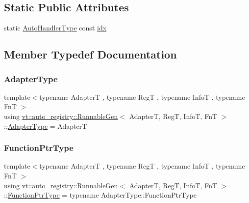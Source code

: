 \subsection*{Static Public Attributes}
\begin{DoxyCompactItemize}
\item 
static \hyperlink{namespacevt_1_1auto__registry_ae295e18699146815bb7d7674594d95d7}{Auto\+Handler\+Type} const \hyperlink{structvt_1_1auto__registry_1_1_runnable_gen_a7feb1522810ba800d935ee58d970720d}{idx}
\end{DoxyCompactItemize}


\subsection{Member Typedef Documentation}
\mbox{\label{structvt_1_1auto__registry_1_1_runnable_gen_a19d340c580c1b042a173e22650f88cd7}} 
\subsubsection{\texorpdfstring{Adapter\+Type}{AdapterType}}
{\footnotesize\ttfamily template$<$typename AdapterT , typename RegT , typename InfoT , typename FnT $>$ \\
using \hyperlink{structvt_1_1auto__registry_1_1_runnable_gen}{vt\+::auto\+\_\+registry\+::\+Runnable\+Gen}$<$ AdapterT, RegT, InfoT, FnT $>$\+::\hyperlink{structvt_1_1auto__registry_1_1_runnable_gen_a19d340c580c1b042a173e22650f88cd7}{Adapter\+Type} =  AdapterT}

\mbox{\label{structvt_1_1auto__registry_1_1_runnable_gen_a5e4295a0af4d2d89a37687c63afb0591}} 
\subsubsection{\texorpdfstring{Function\+Ptr\+Type}{FunctionPtrType}}
{\footnotesize\ttfamily template$<$typename AdapterT , typename RegT , typename InfoT , typename FnT $>$ \\
using \hyperlink{structvt_1_1auto__registry_1_1_runnable_gen}{vt\+::auto\+\_\+registry\+::\+Runnable\+Gen}$<$ AdapterT, RegT, InfoT, FnT $>$\+::\hyperlink{structvt_1_1auto__registry_1_1_runnable_gen_a5e4295a0af4d2d89a37687c63afb0591}{Function\+Ptr\+Type} =  typename Adapter\+Type\+::\+Function\+Ptr\+Type}

